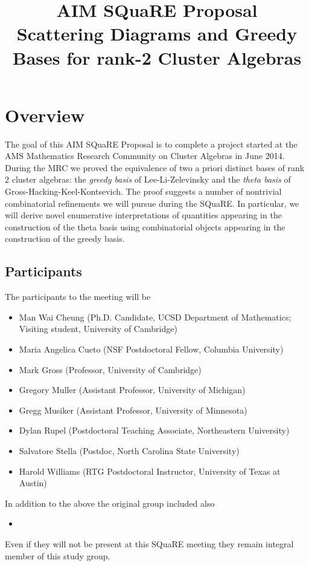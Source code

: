 \documentclass{amsart}
\title[\small{Scattering Diagrams and Greedy Bases for rank-2 Cluster Algebras}]
  {AIM SQuaRE Proposal\\ 
  \small{Scattering Diagrams and Greedy Bases for rank-2 Cluster Algebras}}
\begin{document}
  \maketitle
  
  \section*{Overview}
    The goal of this AIM SQuaRE Proposal is to complete a project started at the
    AMS Mathematics Research Community on Cluster Algebras in June 2014.
    During the MRC we proved the equivalence of two a priori distinct bases of
    rank 2 cluster algebras: the \emph{greedy basis} of Lee-Li-Zelevinsky and
    the \emph{theta basis} of Gross-Hacking-Keel-Kontsevich.
    The proof suggests a number of nontrivial combinatorial refinements we will
    pursue during the SQuaRE.
    In particular, we will derive novel enumerative interpretations of
    quantities appearing in the construction of the theta basis using
    combinatorial objects appearing in the construction of the greedy basis.

  \subsection*{Participants}
    The participants to the meeting will be 
    \begin{itemize}
      \item Man Wai Cheung (Ph.D. Candidate, UCSD Department of Mathematics;
          Visiting student, University of Cambridge)
      \item Maria Angelica Cueto (NSF Postdoctoral Fellow, Columbia University)
      \item Mark Gross (Professor, University of Cambridge)
      \item Gregory Muller (Assistant Professor, University of Michigan)
      \item Gregg Musiker (Assistant Professor, University of Minnesota)
      \item Dylan Rupel (Postdoctoral Teaching Associate, Northeastern
          University)
      \item Salvatore Stella (Postdoc, North Carolina State University)
      \item Harold Williams (RTG Postdoctoral Instructor, University of 
          Texas at Austin) 
    \end{itemize}
    In addition to the above the original group included also
    \begin{itemize}
      \item
    \end{itemize}
    Even if they will not be present at this SQuaRE meeting they remain integral
    member of this study group. 
  
\end{document}
